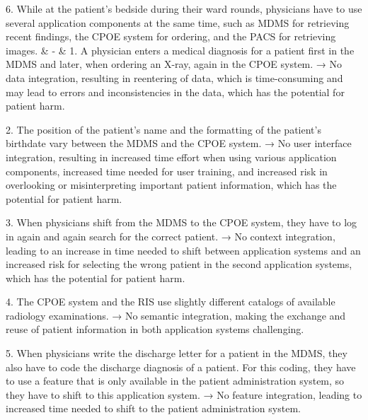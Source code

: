 6. While at the patient's bedside during their ward rounds, physicians have to use several application components at the same time, such as MDMS for retrieving recent findings, the CPOE system for ordering, and the PACS for retrieving images. & - & 1. A physician enters a medical diagnosis for a patient first in the MDMS and later, when ordering an X-ray, again in the CPOE system. → No data integration, resulting in reentering of data, which is time-consuming and may lead to errors and inconsistencies in the data, which has the potential for patient harm.
 
2. The position of the patient's name and the formatting of the patient's birthdate vary between the MDMS and the CPOE system. → No user interface integration, resulting in increased time effort when using various application components, increased time needed for user training, and increased risk in overlooking or misinterpreting important patient information, which has the potential for patient harm.
 
3. When physicians shift from the MDMS to the CPOE system, they have to log in again and again search for the correct patient. → No context integration, leading to an increase in time needed to shift between application systems and an increased risk for selecting the wrong patient in the second application systems, which has the potential for patient harm.
 
4. The CPOE system and the RIS use slightly different catalogs of available radiology examinations. → No semantic integration, making the exchange and reuse of patient information in both application systems challenging.
 
5. When physicians write the discharge letter for a patient in the MDMS, they also have to code the discharge diagnosis of a patient. For this coding, they have to use a feature that is only available in the patient administration system, so they have to shift to this application system. → No feature integration, leading to increased time needed to shift to the patient administration system.
 
